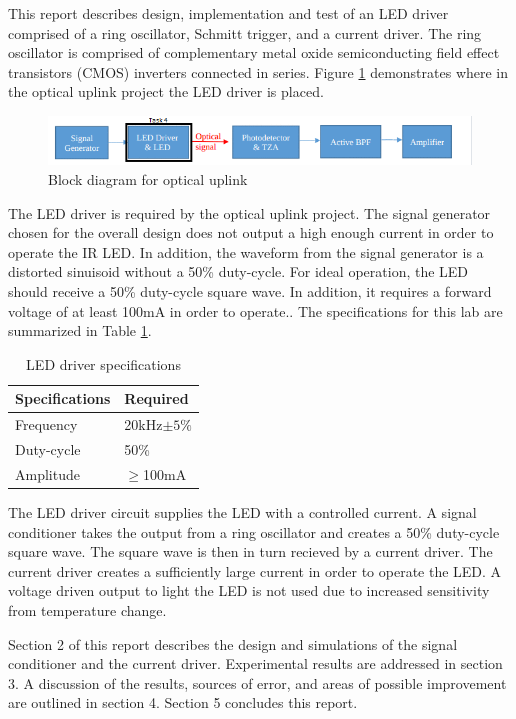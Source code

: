 




\noindent This report describes design, implementation and test of an LED driver comprised of a ring oscillator, Schmitt trigger, and a current driver. The ring oscillator is comprised of complementary metal oxide semiconducting field effect transistors (CMOS) inverters connected in series. Figure \ref{fig:blockdiagram2} demonstrates where in the optical uplink project the LED driver is placed. 



\begin{figure}[H]
    \centering
    \includegraphics[width=.9\textwidth ]{Introduction/Block_Diagram_MFBP.png}
    \caption{Block diagram for optical uplink \cite{b1}}
    \label{fig:blockdiagram2}
\end{figure}
The LED driver is required by the optical uplink project. The signal generator chosen for the overall design does not output a high enough current in order to operate the IR LED. In addition, the waveform from the signal generator is a distorted sinuisoid without a 50\% duty-cycle. For ideal operation, the LED should receive a 50\% duty-cycle square wave. In addition, it requires a forward voltage of at least 100mA in order to operate.. The specifications for this lab are summarized in Table \ref{tab:specifications}.

\begin{table}[H]
	\centering
	\caption{LED driver specifications}
	\label{tab:specifications}
	\begin{tabular}{|l|l|}
		\hline
		Specifications & Required       \\ \hline
		Frequency      & 20kHz$\pm 5\%$ \\ \hline
		Duty-cycle     & 50\%           \\ \hline
		Amplitude      & $\geq$100mA    \\ \hline
	\end{tabular}
\end{table}


The LED driver circuit supplies the LED with a controlled current. A signal conditioner takes the output from a ring oscillator and creates a 50\% duty-cycle square wave. The square wave is then in turn recieved by a current driver. The current driver creates a sufficiently large current in order to operate the LED.  A voltage driven output to light the LED is not used due to increased sensitivity from temperature change. 


Section 2 of this report describes the design and simulations of the signal conditioner and the current driver. Experimental results are addressed in section 3. A discussion of the results, sources of error, and areas of possible improvement are outlined in section 4. Section 5 concludes this report. \newline



